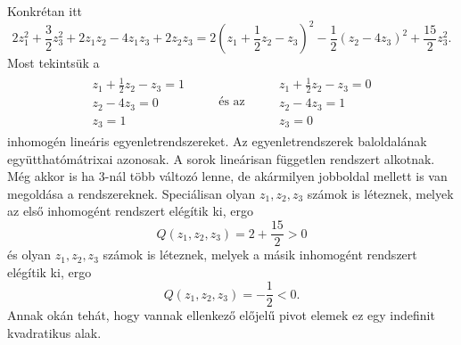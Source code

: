 \documentclass[a4paper, showtrims]{memoir}
\theoremstyle{plain}
\theoremstyle{remark}
\theoremstyle{definition}
\begin{document}
Konkrétan itt
\[
    2z_1^2+\frac{3}{2}z_3^2+2z_1z_2-4z_1z_3+2z_2z_3
    =
    2\left( z_1+\frac{1}{2}z_2-z_3 \right)^2
    -\frac{1}{2}\left( z_2-4z_3 \right)^2
    +\frac{15}{2}z_3^2.
\]
Most tekintsük a 
\begin{align*}
    \begin{array}{r}
    z_1+\frac{1}{2}z_2-z_3= 1\\
    z_2-4z_3= 0\\
    z_3= 1
    \end{array}
\qquad\text{ és az }\qquad
\begin{array}{r}
    z_1+\frac{1}{2}z_2-z_3= 0\\
    z_2-4z_3= 1\\
    z_3= 0
    \end{array}
\end{align*}
inhomogén lineáris egyenletrendszereket.
Az egyenletrendszerek baloldalának együtthatómátrixai azonosak.
A sorok lineárisan független rendszert alkotnak.
Még akkor is ha 3-nál több változó lenne, de akármilyen jobboldal mellett is van megoldása a rendszereknek.
Speciálisan olyan $z_1,z_2,z_3$ számok is léteznek, melyek az első inhomogént rendszert elégítik ki, ergo
\[
    Q\left( z_1,z_2,z_3 \right)=2+\frac{15}{2}>0
\]
és olyan $z_1,z_2,z_3$ számok is léteznek, melyek a másik inhomogént rendszert elégítik ki, ergo
\[
    Q\left( z_1,z_2,z_3 \right)=-\frac{1}{2}<0.
\]
Annak okán tehát, hogy vannak ellenkező előjelű pivot elemek ez egy indefinit kvadratikus alak.
\end{document}
